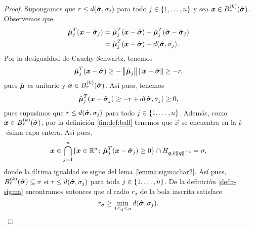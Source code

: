 \begin{proof}
	Supongamos que $r \leq d(\hat{\boldsymbol{ \sigma }}, \sigma_j)$ para todo $j \in \lbrace 1, \ldots, n \rbrace$ y sea
	$\boldsymbol{x} \in B_r^{(k)}(\hat{\boldsymbol{ \sigma }})$. Observemos que
	\begin{align*}
		\hat{\boldsymbol{\mu}}_j^T(\boldsymbol{x} - \hat{\boldsymbol{ \sigma }}_j)
		&= 
		\hat{\boldsymbol{\mu}}_j^T(\boldsymbol{x} - \hat{\boldsymbol{ \sigma }})
		+
		\hat{\boldsymbol{\mu}}_j^T(\hat{\boldsymbol{ \sigma }} - \hat{\boldsymbol{ \sigma }}_j) \\
		&=
		\hat{\boldsymbol{\mu}}_j^T(\boldsymbol{x} - \hat{\boldsymbol{ \sigma }}) + d(\hat{\boldsymbol{ \sigma }}, \sigma_j).
	\end{align*}
	Por la desigualdad de Cauchy-Schwartz, tenemos
	\begin{equation*}
		\hat{\boldsymbol{\mu}}_j^T(\boldsymbol{x} - \hat{\boldsymbol{ \sigma }}) \geq -\left\lVert \hat{\boldsymbol{\mu}}_j \right\rVert\left\lVert \boldsymbol{x} -
		\hat{\boldsymbol{ \sigma }} \right\rVert \geq -r,
	\end{equation*}
	pues $\hat{\boldsymbol{\mu}}$ es unitario y $\boldsymbol{x} \in B_r^{(k)}(\hat{\boldsymbol{ \sigma }})$. Así pues, tenemos
	\begin{equation*}
		\hat{\boldsymbol{\mu}}_j^T(\boldsymbol{x} - \hat{\boldsymbol{ \sigma }}_j) \geq -r + d(\hat{\boldsymbol{ \sigma }}, \sigma_j) \geq 0,
	\end{equation*}
	pues supusimos que $r \leq d(\hat{\boldsymbol{ \sigma }}, \sigma_j)$ para todo $j \in \lbrace 1, \ldots, n \rbrace$.
	Además, como $\boldsymbol{x} \in B_r^{(k)}(\hat{\boldsymbol{ \sigma }})$, por la definición \ref{fin:def:ball} tenemos
	que $\vec{x}$ se encuentra en la $k$-ésima capa entera. Así pues,
	\begin{equation*}
		\boldsymbol{x} \in
		\bigcap_{j=1}^{n}
		\lbrace \boldsymbol{x} \in \mathbb{R}^n \colon \hat{\boldsymbol{\mu}}_j^T(\boldsymbol{x} - \hat{\boldsymbol{ \sigma }}_j) \geq 0 \rbrace
		\cap H_{\boldsymbol{q}, k\left\lVert \boldsymbol{q} \right\rVert^{-2}} = \sigma,
	\end{equation*}
	donde la última igualdad se sigue del lema \ref{lemma:sigmachar2}. Así pues,
	$B_r^{(k)}(\hat{\boldsymbol{ \sigma }}) \subseteq \sigma$ si $r \leq d(\hat{\boldsymbol{ \sigma }}, \sigma_j)$ para toda $j
	\in \lbrace 1, \ldots, n \rbrace$. De la definición \ref{def:r-sigma} encontramos entonces que el radio
	$r_\sigma$ de la bola inscrita satisface
	\begin{equation}
		\label{r-sigma:down}
		r_\sigma \geq \min_{1 \leq j \leq n}d(\hat{\boldsymbol{ \sigma }}, \sigma_j).
	\end{equation}


\end{proof}
